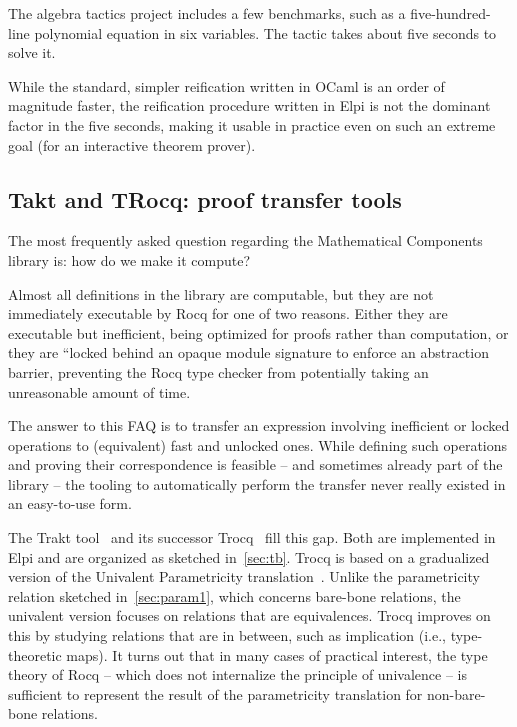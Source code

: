 \documentclass[a4paper, 11pt]{book}
\begin{document}
The algebra tactics project includes a few benchmarks, such as a five-hundred-
line polynomial equation in six variables. The  tactic takes about
five seconds to solve it.

While the standard, simpler reification written in OCaml is an order of
magnitude faster, the reification procedure written in Elpi is not the dominant
factor in the five seconds, making it usable in practice even on such an
extreme goal (for an interactive theorem prover).


\subsection{Takt and TRocq: proof transfer tools}


The most frequently asked question regarding the Mathematical Components
library is: how do we make it compute?

Almost all definitions in the library are computable, but they are not
immediately executable by Rocq for one of two reasons. Either they are
executable but inefficient, being optimized for proofs rather than
computation, or they are ``locked behind an opaque module signature to enforce
an abstraction barrier, preventing the Rocq type checker from potentially
taking an unreasonable amount of time.

The answer to this FAQ is to transfer an expression involving inefficient or
locked operations to (equivalent) fast and unlocked ones. While defining such
operations and proving their correspondence is feasible -- and sometimes already
part of the library -- the tooling to automatically perform the transfer never
really existed in an easy-to-use form.

The Trakt tool~\cite{DBLP:conf/cpp/Blot0CPKMV23} and its successor
Trocq~\cite{10.1007/978-3-031-57262-3_10} fill this gap. Both are implemented
in Elpi and are organized as sketched in~\cref{sec:tb}. Trocq is based on a
gradualized version of the Univalent Parametricity
translation~\cite{10.1145/3429979}. Unlike the parametricity relation
sketched in~\cref{sec:param1}, which concerns bare-bone relations, the
univalent version focuses on relations that are equivalences. Trocq improves
on this by studying relations that are in between, such as implication (i.e.,
type-theoretic maps). It turns out that in many cases of practical interest,
the type theory of Rocq -- which does not internalize the principle of
univalence -- is sufficient to represent the result of the parametricity
translation for non-bare-bone relations.
\end{document}
